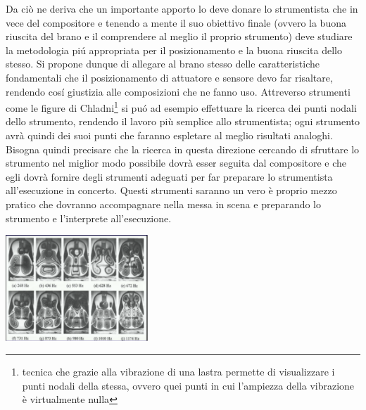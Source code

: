 \documentclass[oneside]{article}
\begin{document}
\begin{multicols*}{2}
Da ciò ne deriva che un importante apporto lo deve donare lo strumentista che in vece del compositore e tenendo a mente il suo obiettivo finale (ovvero la buona riuscita del brano e il comprendere al meglio il proprio strumento) deve studiare la metodologia piú appropriata per il posizionamento e la buona riuscita dello stesso. Si propone dunque di allegare al brano stesso delle caratteristiche fondamentali che il posizionamento di attuatore e sensore devo far risaltare, rendendo cosí giustizia alle composizioni che ne fanno uso. Attreverso strumenti come le figure di Chladni\footnote{tecnica che grazie alla vibrazione di una lastra permette di visualizzare i punti nodali della stessa, ovvero quei punti in cui l'ampiezza della vibrazione è virtualmente nulla} si puó ad esempio effettuare la ricerca dei punti nodali dello strumento, rendendo il lavoro più semplice allo strumentista; ogni strumento avrà quindi dei suoi punti che faranno espletare al meglio risultati analoghi. Bisogna quindi precisare che la ricerca in questa direzione cercando di sfruttare lo strumento nel miglior modo possibile dovrà esser seguita dal compositore e che egli dovrà fornire degli strumenti adeguati per far preparare lo strumentista all'esecuzione in concerto. Questi strumenti saranno un vero è proprio mezzo pratico che dovranno accompagnare nella messa in scena e preparando lo strumento e l'interprete all'esecuzione.


\includegraphics[width=0.4\textwidth]{img/chladni1.png}


\end{multicols*}
\end{document}
